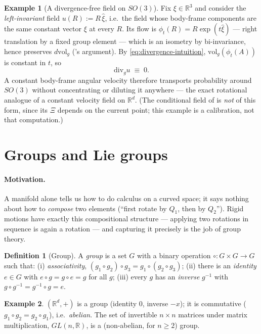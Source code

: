 \documentclass[11pt,a4paper]{report}
\theoremstyle{definition}
\newtheorem{definition}[definition]{Definition}
\newtheorem{example}[example]{Example}
\theoremstyle{remark}
\newcommand{\RR}{\mathbb R}
\begin{document}
\begin{example}[A divergence-free field on $SO(3)$]
\label{ex:so3-divergence-free}
Fix $\xi\in\RR^3$ and consider the \emph{left-invariant} field
$u(R):=R\,\widehat\xi$, i.e.\ the field whose body-frame components are the
same constant vector $\xi$ at every $R$. Its flow is
$\phi_t(R)=R\exp(t\widehat\xi)$ --- right translation by a fixed group
element --- which is an isometry by bi-invariance, hence preserves
$d\mathrm{vol}_g$ ('s argument). By
\eqref{eq:divergence-intuition}, $\mathrm{vol}_g(\phi_t(A))$ is constant in
$t$, so
\[
\mathrm{div}_g u \;\equiv\; 0 .
\]
A constant body-frame angular velocity therefore transports probability
around $SO(3)$ without concentrating or diluting it anywhere --- the exact
rotational analogue of a constant velocity field on $\RR^d$. (The
conditional field of  is \emph{not} of this form,
since its $\Xi$ depends on the current point; this example is a calibration,
not that computation.)
\end{example}

\section{Groups and Lie groups}
\label{sec:groups-scratch}

\paragraph{Motivation.} A manifold alone tells us how to do calculus on a
curved space; it says nothing about how to \emph{compose} two elements
(``first rotate by $Q_1$, then by $Q_2$''). Rigid motions have exactly this
compositional structure --- applying two rotations in sequence is again a
rotation --- and capturing it precisely is the job of group theory.

\begin{definition}[Group]
\label{def:group}
A \emph{group} is a set $G$ with a binary operation
$\circ:G\times G\to G$ such that: (i) \emph{associativity},
$(g_1\circ g_2)\circ g_3=g_1\circ(g_2\circ g_3)$; (ii) there is an
\emph{identity} $e\in G$ with $e\circ g=g\circ e=g$ for all $g$; (iii) every
$g$ has an \emph{inverse} $g^{-1}$ with $g\circ g^{-1}=g^{-1}\circ g=e$.
\end{definition}

\begin{example}
$(\RR^d,+)$ is a group (identity $0$, inverse $-x$); it is commutative
($g_1\circ g_2=g_2\circ g_1$), i.e.\ \emph{abelian}. The set of invertible
$n\times n$ matrices under matrix multiplication, $GL(n,\RR)$, is a
(non-abelian, for $n\ge2$) group.
\end{example}
\end{document}
